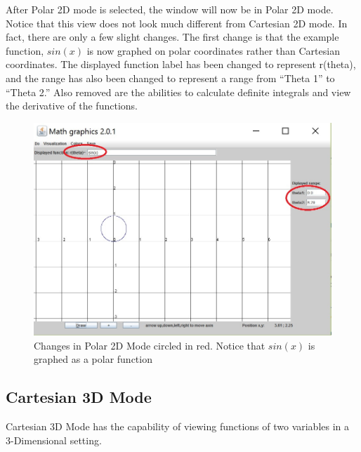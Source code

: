 \documentclass{article}[12 pt]
\begin{document}
			After Polar 2D mode is selected, the window will now be in Polar 2D mode. Notice that this view does not look much different from Cartesian 2D mode. In fact, there are only a few slight changes. The first change is that the example function, $sin(x)$ is now graphed on polar coordinates rather than Cartesian coordinates. The displayed function label has been changed to represent r(theta), and the range has also been changed to represent a range from ``Theta 1'' to ``Theta 2.'' Also removed are the abilities to calculate definite integrals and view the derivative of the functions.
				\begin{figure}[h!]
				 \centering
				 \includegraphics[scale=.70]{polarMode}
				 \caption{Changes in Polar 2D Mode circled in red. Notice that $sin(x)$ is graphed as a polar function}
				\end{figure}

	\subsection{Cartesian 3D Mode}
		Cartesian 3D Mode has the capability of viewing functions of two variables in a 3-Dimensional setting. 	
\end{document}
